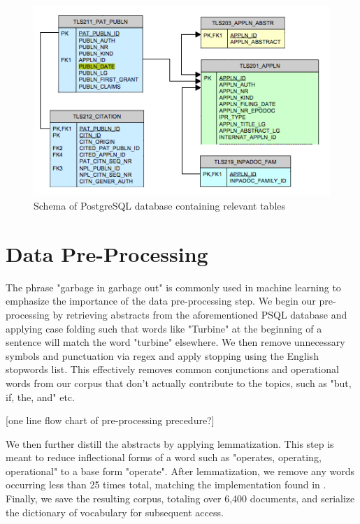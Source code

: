 \begin{figure}[h]
\centering
\includegraphics[width=130mm,scale=0.45]{Figures/psql_schema}
\decoRule
\caption[PSQLSchema]{Schema of PostgreSQL database containing relevant tables}
\label{fig:psqlSchema}
\end{figure}



\section{Data Pre-Processing}

The phrase "garbage in garbage out" is commonly used in machine learning to emphasize the importance of the data pre-processing step. We begin our pre-processing by retrieving abstracts from the aforementioned PSQL database and applying case folding such that words like "Turbine" at the beginning of a sentence will match the word "turbine" elsewhere. We then remove unnecessary symbols and punctuation via regex and apply stopping using the English  stopwords list. This effectively removes common conjunctions and operational words from our corpus that don't actually contribute to the topics, such as "but, if, the, and" etc. 

[one line flow chart of pre-processing precedure?]

We then further distill the abstracts by applying lemmatization. This step is meant to reduce inflectional forms of a word such as "operates, operating, operational" to a base form "operate". After lemmatization, we remove any words occurring less than 25 times total, matching the implementation found in \parencite{Blei:2006:DTM:1143844.1143859}. Finally, we save the resulting corpus, totaling over 6,400 documents, and serialize the dictionary of vocabulary for subsequent access.

